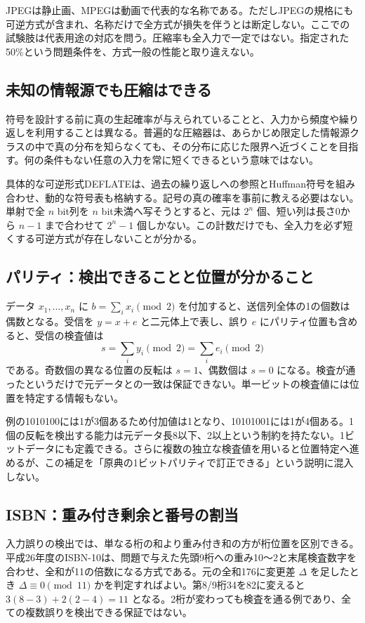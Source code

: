 JPEGは静止画、MPEGは動画で代表的な名称である\cite{info_jpeg,info_mpeg}。ただしJPEGの規格にも可逆方式が含まれ、名称だけで全方式が損失を伴うとは断定しない。ここでの試験肢は代表用途の対応を問う。圧縮率も全入力で一定ではない。指定された50\%という問題条件を、方式一般の性能と取り違えない。

\subsection{未知の情報源でも圧縮はできる}
\label{theory:information:universal}
符号を設計する前に真の生起確率が与えられていることと、入力から頻度や繰り返しを利用することは異なる。普遍的な圧縮器は、あらかじめ限定した情報源クラスの中で真の分布を知らなくても、その分布に応じた限界へ近づくことを目指す\cite{info_universal}。何の条件もない任意の入力を常に短くできるという意味ではない。

具体的な可逆形式DEFLATEは、過去の繰り返しへの参照とHuffman符号を組み合わせ、動的な符号表も格納する\cite{info_deflate}。記号の真の確率を事前に教える必要はない。単射で全 \(n\) bit列を \(n\) bit未満へ写そうとすると、元は \(2^n\) 個、短い列は長さ0から \(n-1\) まで合わせて \(2^n-1\) 個しかない。この計数だけでも、全入力を必ず短くする可逆方式が存在しないことが分かる。

\subsection{パリティ：検出できることと位置が分かること}
\label{theory:information:parity}
データ \(x_1,\ldots,x_n\) に \(b=\sum_ix_i\pmod2\) を付加すると、送信列全体の1の個数は偶数となる。受信を \(y=x+e\) と二元体上で表し、誤り \(e\) にパリティ位置も含めると、受信の検査値は
\[
 s=\sum_i y_i\pmod2=\sum_i e_i\pmod2
\]
である。奇数個の異なる位置の反転は \(s=1\)、偶数個は \(s=0\) になる\cite{info_errors}。検査が通ったというだけで元データとの一致は保証できない。単一ビットの検査値には位置を特定する情報もない。

例の1010100には1が3個あるため付加値は1となり、10101001には1が4個ある。1個の反転を検出する能力は元データ長8以下、2以上という制約を持たない。1ビットデータにも定義できる。さらに複数の独立な検査値を用いると位置特定へ進めるが、この補足を「原典の1ビットパリティで訂正できる」という説明に混入しない。

\subsection{ISBN：重み付き剰余と番号の割当}
\label{theory:information:checksum}
入力誤りの検出では、単なる桁の和より重み付き和の方が桁位置を区別できる。平成26年度のISBN-10は、問題で与えた先頭9桁への重み10〜2と末尾検査数字を合わせ、全和が11の倍数になる方式である。元の全和176に変更差 \(\Delta\) を足したとき \(\Delta\equiv0\pmod{11}\) かを判定すればよい。第8/9桁34を82に変えると \(3(8-3)+2(2-4)=11\) となる。2桁が変わっても検査を通る例であり、全ての複数誤りを検出できる保証ではない。

